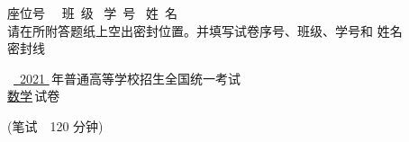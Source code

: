 \documentclass[twocolumn,landscape]{article}
\newcommand{\putzdx}{\marginpar{
		\parbox{1cm}{\vspace{-1.6cm}
			\rotatebox[origin=c]{90}{
				\usebox{\zdx}
		}}
}}
\begin{document}
\fancyhf{}
\sbox{\zdx}
{\parbox{27cm}{\centering
	座位号~\underline{\makebox[34mm][c]{}}~ 班~级\underline{\makebox[34mm][c]{}}~ 学~号\underline{\makebox[44mm][c]{}}~ 姓~名\underline{\makebox[34mm][c]{}} ~\\
	\vspace{3mm}
请在所附答题纸上空出密封位置。并填写试卷序号、班级、学号和 姓名\\
\vspace{1mm}
\dotfill{} 密\dotfill{}封\dotfill{}线\dotfill{} \\
	}}
	\reversemarginpar
	
\begin{spacing}{1.25}
	\begin{center}
\begin{LARGE}
~\underline{~2021 }\,年普通高等学校招生全国统一考试\\
\underline{数学}\,试卷\\
\end{LARGE}
(笔试\ \ 120 分钟)\\

\end{center}
\end{spacing}
\setlength{\marginparsep}{1.7cm}
\putzdx %

  
\end{document}
